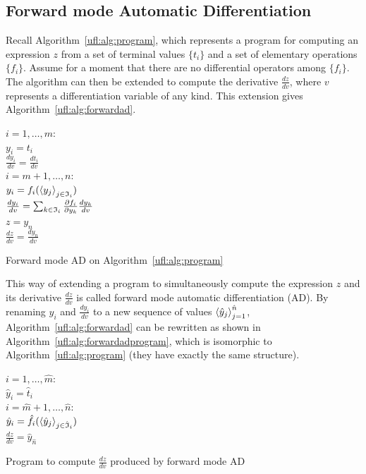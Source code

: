 \subsection{Forward mode Automatic Differentiation}
\label{ufl:sec:forwardad}

Recall Algorithm~\ref{ufl:alg:program}, which represents a program for
computing an expression $z$ from a set of terminal values $\{ t_i \}$
and a set of elementary operations $\{ f_i \}$. Assume for a moment
that there are no differential operators among $\{ f_i \}$.  The
algorithm can then be extended to compute the derivative $\frac{d z}{d
  v}$, where $v$ represents a differentiation variable of any kind.
This extension gives Algorithm~\ref{ufl:alg:forwardad}.

\begin{algorithm}
\afor $i = 1, \ldots, m$:\\
\tab $y_i = t_i$ \\
\tab $\frac{d y_i}{d v} = \frac{d t_i}{d v}$ \\
\afor $i = m+1, \ldots, n$:\\
\tab $y_i = f_i(\left\langle{y_j}\right\rangle_{j\in\mathfrak{I}_i})$ \\
\tab $\frac{d y_i}{d v} = \sum_{k\in\mathfrak{I}_i} \frac{\partial f_i}{\partial y_k} \frac{d y_k}{d v}$ \\
$z = y_n$ \\
$\frac{d z}{d v} = \frac{d y_n}{d v}$
\caption{Forward mode AD on Algorithm~\ref{ufl:alg:program}}
\label{ufl:alg:forwardad}
\end{algorithm}

This way of extending a program to simultaneously compute the
expression $z$ and its derivative $\frac{d z}{d v}$ is called forward
mode automatic differentiation (AD).  By renaming $y_i$ and $\frac{d
  y_i}{d v}$ to a new sequence of values $\left\langle{\hat y_j}\right\rangle_{j=1}^{\hat
  n}$, Algorithm~\ref{ufl:alg:forwardad} can be rewritten as shown in
Algorithm~\ref{ufl:alg:forwardadprogram}, which is isomorphic to
Algorithm~\ref{ufl:alg:program} (they have exactly the same
structure).
\begin{algorithm}
\afor $i = 1, \ldots, \hat m$:\\
\tab $\hat y_i = \hat t_i$ \\
\afor $i = \hat m + 1, \ldots, \hat n$:\\
\tab $\hat y_i = \hat f_i(\left\langle{\hat y_j}\right\rangle_{j\in\hat{\mathfrak{I}}_i})$ \\
$\frac{d z}{d v} = \hat y_{\hat n}$
\caption{Program to compute $\frac{d z}{d v}$ produced by forward mode AD}
\label{ufl:alg:forwardadprogram}
\end{algorithm}

